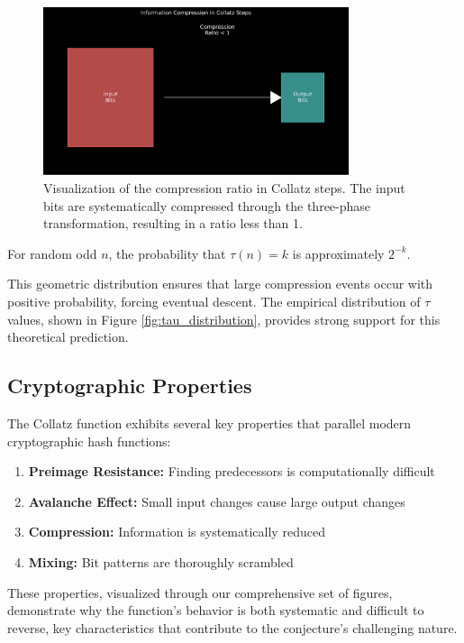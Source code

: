 \begin{figure}[h]
\centering
\includegraphics[width=0.8\textwidth]{figures/compression_ratio.svg}
\caption{Visualization of the compression ratio in Collatz steps. The input bits are systematically compressed through the three-phase transformation, resulting in a ratio less than 1.}
\label{fig:compression_ratio}
\end{figure}

\begin{theorem}\label{thm:compression}
For random odd $n$, the probability that $\tau(n) = k$ is approximately $2^{-k}$.
\end{theorem}

This geometric distribution ensures that large compression events occur with positive probability, forcing eventual descent. The empirical distribution of $\tau$ values, shown in Figure \ref{fig:tau_distribution}, provides strong support for this theoretical prediction.

\subsection{Cryptographic Properties}

The Collatz function exhibits several key properties that parallel modern cryptographic hash functions:

\begin{enumerate}
\item \textbf{Preimage Resistance:} Finding predecessors is computationally difficult
\item \textbf{Avalanche Effect:} Small input changes cause large output changes
\item \textbf{Compression:} Information is systematically reduced
\item \textbf{Mixing:} Bit patterns are thoroughly scrambled
\end{enumerate}

These properties, visualized through our comprehensive set of figures, demonstrate why the function's behavior is both systematic and difficult to reverse, key characteristics that contribute to the conjecture's challenging nature. 